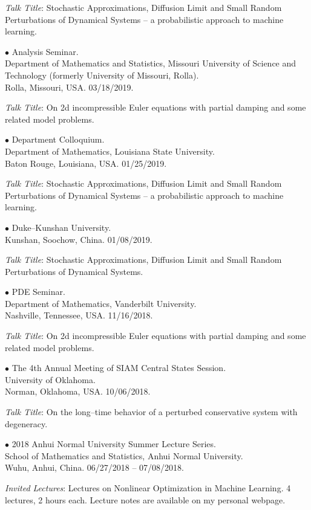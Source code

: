 \documentclass[margin,line]{res}
\begin{document}
\begin{resume}
\textit{Talk Title}: Stochastic Approximations, Diffusion Limit and Small Random Perturbations of Dynamical Systems -- a probabilistic approach to machine learning.

{$\bullet$ Analysis Seminar. \\ Department of Mathematics and Statistics,
Missouri University of Science and Technology (formerly University of Missouri, Rolla). \\
Rolla, Missouri, USA.} \hfill 03/18/2019.

\textit{Talk Title}: On 2d incompressible Euler equations with partial damping and some related model problems.

{$\bullet$ Department Colloquium. \\
Department of Mathematics, Louisiana State University. \\
Baton Rouge, Louisiana, USA.} \hfill 01/25/2019.

\textit{Talk Title}: Stochastic Approximations, Diffusion Limit and Small Random Perturbations of Dynamical Systems -- a probabilistic approach to machine learning.

{$\bullet$ Duke--Kunshan University. \\
Kunshan, Soochow, China.} \hfill 01/08/2019.

\textit{Talk Title}: Stochastic Approximations, Diffusion Limit and Small Random Perturbations of
Dynamical Systems.


{$\bullet$ PDE Seminar. \\
Department of Mathematics, Vanderbilt University. \\
Nashville, Tennessee, USA.} \hfill 11/16/2018.

\textit{Talk Title}: On 2d incompressible Euler equations with partial damping and some related model problems.


{$\bullet$ The 4th Annual Meeting of SIAM Central States Session. \\
University of Oklahoma. \\
Norman, Oklahoma, USA.} \hfill 10/06/2018.

\textit{Talk Title}: On the long--time behavior of a perturbed conservative
system with degeneracy.


{$\bullet$ 2018 Anhui Normal University Summer Lecture Series. \\
School of Mathematics and Statistics, Anhui Normal University. \\
Wuhu, Anhui, China.} \hfill 06/27/2018 -- 07/08/2018.

\textit{Invited Lectures}: Lectures on Nonlinear Optimization in Machine Learning. 4
lectures, 2 hours each. Lecture notes are available on my personal
webpage.



\end{resume}
\end{document}
